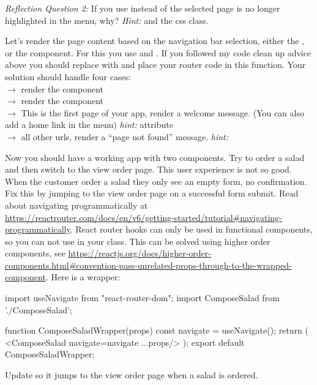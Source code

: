 \documentclass[fleqn, article, a4paper]{memoir}
\begin{document}
\begin{Assignments}
\noindent \emph{Reflection Question 2:} If you use  instead of  the selected page is no longer highlighted in the menu, why? \emph{Hint:}  and the  css class.

\item Let's render the page content based on the navigation bar selection, either the , or the  component. For this you use  and . If you followed my code clean up advice above you should replace  with  and place your router code in this function. Your solution should handle four cases:
\\  $\rightarrow$ render the  component
\\  $\rightarrow$ render the  component
\\  $\rightarrow$ This is the first page of your app, render a welcome message. (You can also add a home link in the menu) \emph{hint:}  attribute
\\  $\rightarrow$ all other urls, render a ``page not found'' message. \emph{hint:} 

\item Now you should have a working app with two components. Try to order a salad and then switch to the view order page. This user experience is not so good. When the customer order a salad they only see an empty form, no confirmation. Fix this by jumping to the view order page on a successful form submit. Read about navigating programmatically at \url{https://reactrouter.com/docs/en/v6/getting-started/tutorial#navigating-programmatically}. React router hooks can only be used in functional components, so you can not use  in your  class. This can be solved using higher order components, see \url{https://reactjs.org/docs/higher-order-components.html#convention-pass-unrelated-props-through-to-the-wrapped-component}. Here is a wrapper:
\begin{Code}
import { useNavigate } from "react-router-dom";
import ComposeSalad from './ComposeSalad';

function ComposeSaladWrapper(props){
  const navigate = useNavigate();
  return (
    <ComposeSalad navigate={navigate} {...props}/>
  );
}
export default ComposeSaladWrapper;
\end{Code}
\noindent Update  so it jumps to the view order page when a salad is ordered.



\end{Assignments}
\end{document}

